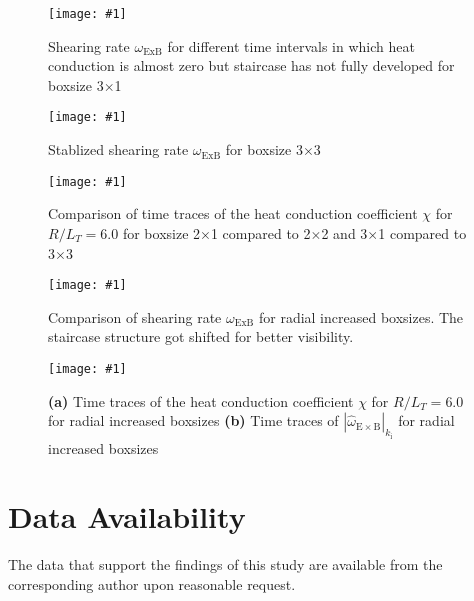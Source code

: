 \documentclass[aip, amsmath, amssymb, reprint, twocolumn]{revtex4-1}
\newcommand{\includegraphicsOneCol}[3]{
	\begin{figure}[h]
		\texttt{[image: \#1]}
		\caption{#2}
  	\end{figure}
	\label{#3}
  	\increasecounter{fig}{1}
}
\newcommand{\includegraphicsTwoCol}[3]{
	\begin{figure*}
    	\texttt{[image: \#1]}
		\caption{#2}
	\end{figure*}
	\label{#3}
	\increasecounter{fig}{2}
}
\begin{document}
\includegraphicsOneCol{S6_rlt6.0/boxsize3x1/Ns16/Nvpar48/Nmu9/S6_rlt6.0_boxsize3x1_Ns16_Nvpar48_Nmu9_wexb_selection.pdf}{
	Shearing rate $\omega_{\mathrm{ExB}}$ for different time intervals in which heat conduction is almost zero but staircase has not fully developed for boxsize 3$\times$1
}{fig:wexb-3x1-selection}

\includegraphicsOneCol{S6_rlt6.0/boxsize3x3/Ns16/Nvpar48/Nmu9/S6_rlt6.0_boxsize3x3_Ns16_Nvpar48_Nmu9_wexb_selection.pdf}{
	Stablized shearing rate $\omega_{\mathrm{ExB}}$ for boxsize 3$\times$3
}{fig:wexb-3x3-stable}

\includegraphicsTwoCol{Comparison/Boxsize/S6_rlt6.0_boxsize2x1-2-3x1-3_Ns16_Nvpar48_Nmu9_eflux_comparison.pdf}{
	Comparison of time traces of the heat conduction coefficient $\chi$ for $R/L_T = 6.0$ for boxsize 2$\times$1 compared to 2$\times$2 and 3$\times$1 compared to 3$\times$3
}{fig:eflux-2x1-2-3x1-3-comparison}

\includegraphicsTwoCol{Comparison/Boxsize/S6_rlt6.0_boxsize1-2-3-4x1_Ns16_Nvpar48_Nmu9_wexb_comparison.pdf}{
	Comparison of shearing rate $\omega_{\mathrm{ExB}}$ for radial increased boxsizes. The staircase structure got 
	shifted for better visibility.
}{fig:wexb-1-2-3-4x1-stable-comparison}

\includegraphicsTwoCol{Comparison/Boxsize/S6_rlt6.0_boxsize1-2-3-4x1_Ns16_Nvpar48_Nmu9_comparison.pdf}{
	\textbf{(a)} Time traces of the heat conduction coefficient $\chi$ for $R/L_T = 6.0$ for radial increased boxsizes \linebreak
	\textbf{(b)} Time traces of $|\hat{\omega}_{\mathrm{E\times B}}|_{k_\mathrm{i}}$ for radial increased boxsizes
}{fig:wexb-eflux-1-2-3-4x1-comparison}


\section*{Data Availability}
The data that support the findings of this study are available from the corresponding author upon reasonable request.


\wordcountmessage


\end{document}
